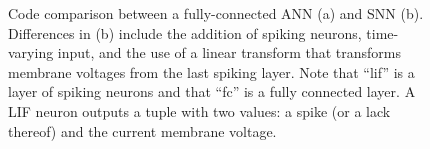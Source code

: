 \documentclass [MS] {UCLAthesis}
\begin{document}
%     

% 

\begin{figure}
    \centering
    \begin{subfigure}{0.40\textwidth}
        \centering
        
        \caption{}
    \end{subfigure}
    \hfill
    \centering
    \begin{subfigure}{0.50\textwidth}
        \centering
        
        \caption{}
    \end{subfigure}
    \caption[Code comparison between a fully-connected ANN and SNN]{Code comparison between a fully-connected ANN (a) and SNN (b). Differences in (b) include the addition of spiking neurons, time-varying input, and the use of a linear transform that transforms membrane voltages from the last spiking layer. Note that ``lif'' is a layer of spiking neurons and that ``fc'' is a fully connected layer. A LIF neuron outputs a tuple with two values: a spike (or a lack thereof) and the current membrane voltage. }
    \label{fig:code}
\end{figure}


\end{document}

